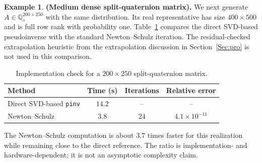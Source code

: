 \documentclass[12pt,a4paper]{article}
\theoremstyle{plain}
\theoremstyle{definition}
\newtheorem{example}[theorem]{Example}
\theoremstyle{remark}
\begin{document}
\begin{example}\label{subsec:ex2}
\textbf{(Medium dense split-quaternion matrix).}
We next generate $A\in\mathbb{Q}_s^{200\times250}$
with the same distribution. Its real representative has size \(400\times500\) and is full row rank with probability one. Table~\ref{tab:medium} compares the direct SVD-based pseudoinverse with the standard Newton--Schulz iteration. The residual-checked extrapolation heuristic from the extrapolation discussion in Section~\ref{Sec:pro} is not used in this comparison.

\begin{table}[H]
\centering
\caption{Implementation check for a \(200\times250\) split-quaternion matrix.}
\label{tab:medium}
\begin{tabular}{lccc}
\toprule
Method & Time (s) & Iterations & Relative error \\
\midrule
Direct SVD-based \texttt{pinv} & \(14.2\) & -- & -- \\
Newton--Schulz & \(3.8\) & \(24\) & \(4.1\times10^{-11}\) \\
\bottomrule
\end{tabular}
\end{table}

The Newton--Schulz computation is about \(3.7\) times faster for this realization while remaining close to the direct reference. The ratio is implementation- and hardware-dependent; it is not an asymptotic complexity claim.
\end{example}
\end{document}
